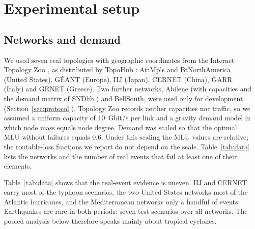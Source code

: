 \documentclass[preprint,12pt]{elsarticle}
\begin{document}
\section{Experimental setup}
\label{sec:setup}

\subsection{Networks and demand}
We used seven real topologies with geographic coordinates from the Internet Topology Zoo \cite{topozoo11}, as distributed by TopoHub \cite{topohub23}: AttMpls and BtNorthAmerica (United States), G\'EANT (Europe), IIJ (Japan), CERNET (China), GARR (Italy) and GRNET (Greece). Two further networks, Abilene (with capacities and the demand matrix of SNDlib \cite{sndlib10}) and BellSouth, were used only for development (Section~\ref{sec:protocol}). Topology Zoo records neither capacities nor traffic, so we assumed a uniform capacity of 10~Gbit/s per link and a gravity demand model in which node mass equals node degree. Demand was scaled so that the optimal MLU without failures equals 0.6. Under this scaling the MLU values are relative; the routable-loss fractions we report do not depend on the scale. Table~\ref{tab:data} lists the networks and the number of real events that fail at least one of their elements.

\begin{table}[t]
\centering
\caption{Test networks and real-event scenarios at the primary thresholds (34-kt winds, MMI VII). Each entry counts events that fail at least one node or link of that network. Training events (before 2018) were used only to select tunnels; test events (2018--2025) only to evaluate them.}
\label{tab:data}
\small
\resizebox{\linewidth}{!}{}
\end{table}

Table~\ref{tab:data} shows that the real-event evidence is uneven. IIJ and CERNET carry most of the typhoon scenarios, the two United States networks most of the Atlantic hurricanes, and the Mediterranean networks only a handful of events. Earthquakes are rare in both periods: seven test scenarios over all networks. The pooled analysis below therefore speaks mainly about tropical cyclones.
\end{document}
